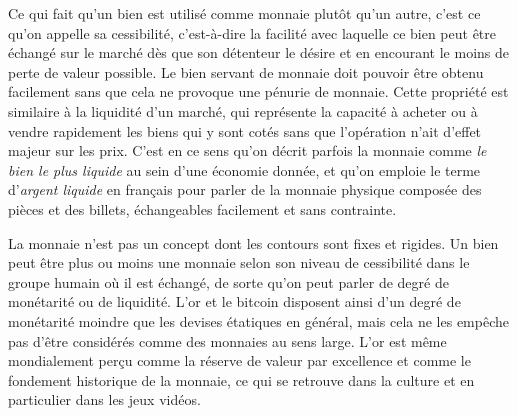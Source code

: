 Ce qui fait qu'un bien est utilisé comme monnaie plutôt qu'un autre, c'est ce qu'on appelle sa cessibilité, c'est-à-dire la facilité avec laquelle ce bien peut être échangé sur le marché dès que son détenteur le désire et en encourant le moins de perte de valeur possible. Le bien servant de monnaie doit pouvoir être obtenu facilement sans que cela ne provoque une pénurie de monnaie. Cette propriété est similaire à la liquidité d'un marché, qui représente la capacité à acheter ou à vendre rapidement les biens qui y sont cotés sans que l'opération n'ait d'effet majeur sur les prix. C'est en ce sens qu'on décrit parfois la monnaie comme \emph{le bien le plus liquide} au sein d'une économie donnée, et qu'on emploie le terme d'\emph{argent liquide} en français pour parler de la monnaie physique composée des pièces et des billets, échangeables facilement et sans contrainte.

La monnaie n'est pas un concept dont les contours sont fixes et rigides. Un bien peut être plus ou moins une monnaie selon son niveau de cessibilité dans le groupe humain où il est échangé, de sorte qu'on peut parler de degré de monétarité ou de liquidité. L'or et le bitcoin disposent ainsi d'un degré de monétarité moindre que les devises étatiques en général, mais cela ne les empêche pas d'être considérés comme des monnaies au sens large. L'or est même mondialement perçu comme la réserve de valeur par excellence et comme le fondement historique de la monnaie, ce qui se retrouve dans la culture et en particulier dans les jeux vidéos. %

